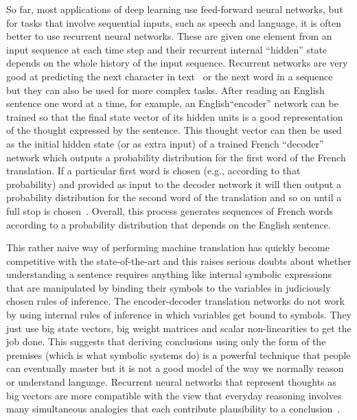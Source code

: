 \documentclass[10pts]{article}
\begin{document}
So far, most applications of deep learning use feed-forward neural
networks, but for tasks that involve sequential inputs, such as speech
and language, it is often better to use recurrent neural
networks. These are given one element from an input 
sequence at each time step and their recurrent internal
``hidden'' state depends on the whole history of the input
sequence. Recurrent networks are very good at predicting the next
character in text~\citep{Sutskever-et-al-ICML2011} or the next
word in a sequence~\citep{Mikolov-et-al-NIPS2013} but they can also be
used for more complex tasks.  After reading an English sentence one
word at a time, for example, an English``encoder'' network can be
trained so that the final state vector of its hidden units is a good
representation of the thought expressed by the sentence.  This thought
vector can then be used as the initial hidden state (or as extra
input) of a trained French ``decoder'' network which outputs a
probability distribution for the first word of the French
translation. If a particular first word is chosen (e.g., according to
that probability) and provided as input to the decoder network it will
then output a probability distribution for the second word of the
translation and so on until a full stop is
chosen~\citep{Bahdanau-et-al-arxiv2014,Sutskever-et-al-NIPS2014}.
Overall, this process generates sequences of French words according to
a probability distribution that depends on the English sentence.

This rather naive way of performing machine translation has quickly become
competitive with the state-of-the-art and this raises serious doubts about
whether understanding a sentence requires anything like internal symbolic
expressions that are manipulated by binding their symbols to the variables
in judiciously chosen rules of inference.  The encoder-decoder translation
networks do not work by using internal rules of inference in which
variables get bound to symbols. They just use big state vectors, big weight
matrices and scalar non-linearities to get the job done.  This suggests
that deriving conclusions using only the form of the premises (which is
what symbolic systems do) is a powerful
technique that people can eventually master but it is not a good model of
the way we normally reason or understand language. Recurrent neural
networks that represent thoughts as big vectors are more compatible with
the view that everyday reasoning involves many simultaneous analogies that
each contribute plausibility to a conclusion~\citep{metaphors}.
\end{document}
